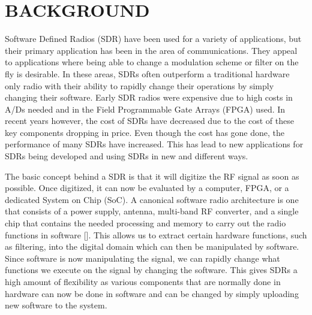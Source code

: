\chapter{BACKGROUND}




Software Defined Radios (SDR) have been used for a variety of applications, but their primary application has been in the area of communications.  They appeal to applications where being able to change a modulation scheme or filter on the fly is desirable.  In these areas, SDRs often outperform a traditional hardware only radio with their ability to rapidly change their operations by simply changing their software.  Early SDR radios were expensive due to high costs in A/Ds needed and in the Field Programmable Gate Arrays (FPGA) used.  In recent years however, the cost of SDRs have decreased due to the cost of these key components dropping in price.  Even though the cost has gone done, the performance of many SDRs have increased.  This has lead to new applications for SDRs being developed and using SDRs in new and different ways.

The basic concept behind a SDR is that it will digitize the RF signal as soon as possible.  Once digitized, it can now be evaluated by a computer, FPGA, or a dedicated System on Chip (SoC).  A canonical software radio architecture is one that consists of a power supply, antenna, multi-band RF converter, and a single chip that contains the needed processing and memory to carry out the radio functions in software [\cite{Mitola1995}].  This allows us to extract certain hardware functions, such as filtering, into the digital domain which can then be manipulated by software.  Since software is now manipulating the signal, we can rapidly change what functions we execute on the signal by changing the software.  This gives SDRs a high amount of flexibility as various components that are normally done in hardware can now be done in software and can be changed by simply uploading new software to the system.  

